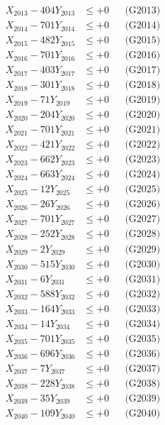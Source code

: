 \documentclass[a4paper,10pt]{article}
\begin{document}
{\begin{align}
X_{2013} - 404Y_{2013} &\leq +0 && \text{(G2013)} \\
X_{2014} - 701Y_{2014} &\leq +0 && \text{(G2014)} \\
X_{2015} - 482Y_{2015} &\leq +0 && \text{(G2015)} \\
X_{2016} - 701Y_{2016} &\leq +0 && \text{(G2016)} \\
X_{2017} - 403Y_{2017} &\leq +0 && \text{(G2017)} \\
X_{2018} - 301Y_{2018} &\leq +0 && \text{(G2018)} \\
X_{2019} - 71Y_{2019} &\leq +0 && \text{(G2019)} \\
X_{2020} - 204Y_{2020} &\leq +0 && \text{(G2020)} \\
\allowbreak
X_{2021} - 701Y_{2021} &\leq +0 && \text{(G2021)} \\
X_{2022} - 421Y_{2022} &\leq +0 && \text{(G2022)} \\
X_{2023} - 662Y_{2023} &\leq +0 && \text{(G2023)} \\
X_{2024} - 663Y_{2024} &\leq +0 && \text{(G2024)} \\
X_{2025} - 12Y_{2025} &\leq +0 && \text{(G2025)} \\
X_{2026} - 26Y_{2026} &\leq +0 && \text{(G2026)} \\
X_{2027} - 701Y_{2027} &\leq +0 && \text{(G2027)} \\
X_{2028} - 252Y_{2028} &\leq +0 && \text{(G2028)} \\
X_{2029} - 2Y_{2029} &\leq +0 && \text{(G2029)} \\
X_{2030} - 515Y_{2030} &\leq +0 && \text{(G2030)} \\
\allowbreak
X_{2031} - 6Y_{2031} &\leq +0 && \text{(G2031)} \\
X_{2032} - 588Y_{2032} &\leq +0 && \text{(G2032)} \\
X_{2033} - 164Y_{2033} &\leq +0 && \text{(G2033)} \\
X_{2034} - 14Y_{2034} &\leq +0 && \text{(G2034)} \\
X_{2035} - 701Y_{2035} &\leq +0 && \text{(G2035)} \\
X_{2036} - 696Y_{2036} &\leq +0 && \text{(G2036)} \\
X_{2037} - 7Y_{2037} &\leq +0 && \text{(G2037)} \\
X_{2038} - 228Y_{2038} &\leq +0 && \text{(G2038)} \\
X_{2039} - 35Y_{2039} &\leq +0 && \text{(G2039)} \\
X_{2040} - 109Y_{2040} &\leq +0 && \text{(G2040)} \\

\end{align}}
\end{document}
